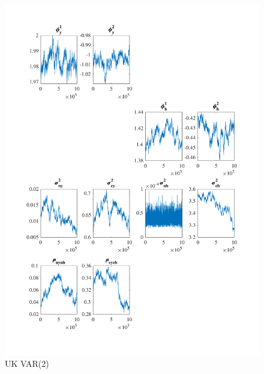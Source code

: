 \documentclass[
  12pt,
]{article}
\begin{document}
\begin{figure}

{\centering \includegraphics[width=0.85\linewidth]{../../Regression/Bayesian_UC_VAR2_drift/OutputData/posteriorchain_UK} 

}

\caption{UK VAR(2)}\label{fig:unnamed-chunk-15}
\end{figure}
\end{document}
